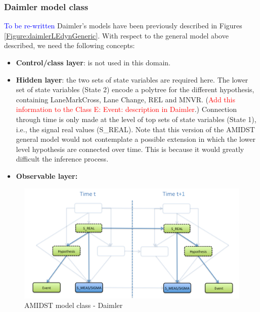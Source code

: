 \subsubsection{Daimler model class}\label{daimlerAMIDSTModels}

\textcolor{blue}{To be re-written}
Daimler's models have been previously described in Figures \ref{Figure:daimlerLEdynGeneric}. With respect to the general model above described, we need the following concepts:

\begin{itemize}
\item \textbf{Control/class layer}: is not used in this domain.
\item \textbf{Hidden layer}: the two sets of state variables are required here. The lower set of state variables (State 2) encode a polytree for the different hypothesis, containing LaneMarkCross, Lane Change, REL and MNVR. (\textcolor{red}{Add this information to the Class E: Event: description in Daimler}.) Connection through time is only made at the level of top sets of state variables (State 1), i.e., the signal real values (S\_REAL). Note that this version of the AMIDST general model would not contemplate a possible extension in which the lower level hypothesis are connected over time. This is because it would greatly difficult the inference process. 
\item \textbf{Observable layer: }
\end{itemize}






\begin{figure}[ht!]
\begin{center}
\includegraphics[scale=0.39]{./figures/AMIDSTModelClassDaimler}
\caption{\label{Figure:AMIDSTModelClassDaimler} AMIDST model class - Daimler}
\end{center}
\end{figure}

